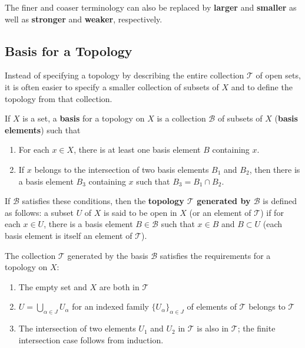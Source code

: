 \begin{remark}
The finer and coaser terminology can also be replaced by \textbf{larger} and \textbf{smaller} as well as \textbf{stronger} and \textbf{weaker}, respectively.
\end{remark}

\subsection{Basis for a Topology}

Instead of specifying a topology by describing the entire collection $\mathscr{T}$ of open sets, it is often easier to specify a smaller collection of subsets of $X$ and 
to define the topology from that collection.
\begin{definition}
If $X$ is a set, a \textbf{basis} for a topology on $X$ is a collection $\mathscr{B}$ of subsets of $X$ (\textbf{basis elements}) such that
\begin{enumerate}
    \item For each $x \in X$, there is at least one basis element $B$ containing $x$.
    \item If $x$ belongs to the intersection of two basis elements $B_1$ and $B_2$, then there is a basis element $B_3$ containing $x$ such that $B_3 = B_1 \cap B_2$.
\end{enumerate}

If $\mathscr{B}$ satisfies these conditions, then the \textbf{topology $\mathscr{T}$ generated by $\mathscr{B}$} is defined as follows:
a subset $U$ of $X$ is said to be open in $X$ (or an element of $\mathscr{T}$) if for each $x \in U$, there is a basis element $B \in \mathscr{B}$ such that $x \in B$ and $B \subset U$
(each basis element is itself an element of $\mathscr{T}$).
\end{definition}

\begin{remark}
The collection $\mathscr{T}$ generated by the basis $\mathscr{B}$ satisfies the requirements for a topology on $X$: 
\begin{enumerate}
    \item The empty set and $X$ are both in $\mathscr{T}$
    \item $U = \bigcup_{\alpha \in J} U_\alpha$ for an indexed family $\{ U_\alpha \}_{\alpha \in J}$ of elements of $\mathscr{T}$ belongs to $\mathscr{T}$
    \item The intersection of two elements $U_1$ and $U_2$ in $\mathscr{T}$ is also in $\mathscr{T}$; the finite intersection case follows from induction.
\end{enumerate}
\end{remark}

